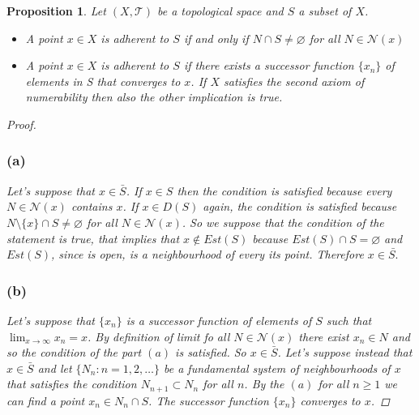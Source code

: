 \documentclass{article}
\newtheorem{proposition}{Proposition}
\begin{document}
    \begin{proposition}
        Let $(X, \mathcal{T})$ be a topological space and $S$ a subset of $X$.
        \begin{itemize}
            \item[a)] A point $x\in X$ is adherent to $S$ if and only if $N \cap S \neq \varnothing$ for all $N\in \mathcal{N}(x)$ 
            \item[b)] A point $x\in X$ is adherent to $S$ if there exists a successor function $\{x_n \}$ of elements in S that converges to $x$. If $X$ satisfies the second axiom of numerability then also the other implication is true. 
        \end{itemize}
        \begin{proof}
            \subsubsection*{(a)} Let's suppose that $x \in \bar{S}$. If $x \in S$ then the condition is satisfied because every $N\in \mathcal{N}(x)$ contains $x$. If $x\in D(S)$ again, the condition is satisfied because $N\setminus \{x \}\cap S \neq \varnothing $ for all $N\in \mathcal{N}(x)$. So we suppose that the condition of the statement is true, that implies that $x \notin Est(S)$ because $Est(S)\cap S = \varnothing$ and $Est(S)$, since is open, is a neighbourhood of every its point. Therefore $x\in \bar{S.}$
            \subsubsection*{(b)} Let's suppose that $\{ x_n \}$ is a successor function of elements of $S$ such that $\lim_{x \to \infty} x_n = x$. By definition of limit fo all $N \in \mathcal{N}(x)$ there exist $x_n \in N$ and so the condition of the part $(a)$ is satisfied. So $x\in \bar{S}$. Let's suppose instead that $x\in \bar{S}$ and let $\{ N_n : n=1,2,\ldots  \}$ be a fundamental system of neighbourhoods of $x$ that satisfies the condition $N_{n+1} \subset N_n$ for all $n$. By the $(a)$ for all $n \geq 1$ we can find a point $x_n \in N_n \cap S$. The successor function $\{ x_n \}$ converges to $x$.
        \end{proof}
    \end{proposition}
    \newpage
\end{document}
